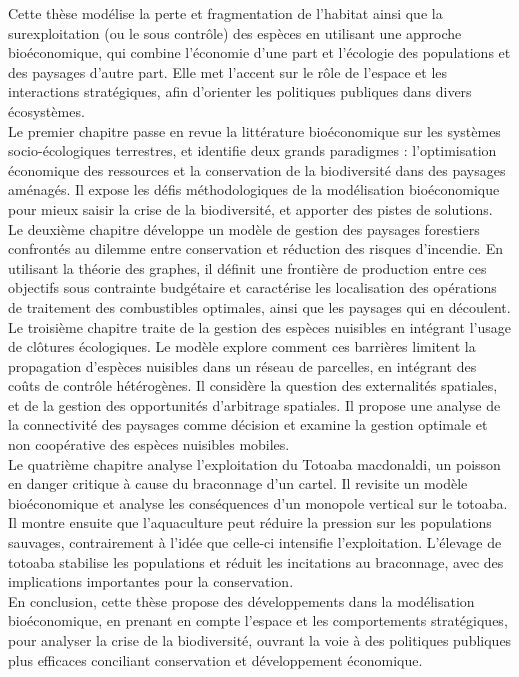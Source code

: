 {Cette thèse modélise la perte et fragmentation de l’habitat ainsi que la surexploitation (ou le sous contrôle) des espèces en utilisant une approche bioéconomique, qui combine l’économie d’une part et l’écologie des populations et des paysages d’autre part. Elle met l’accent sur le rôle de l’espace et les interactions stratégiques, afin d’orienter les politiques publiques dans divers écosystèmes.\\
Le premier chapitre passe en revue la littérature bioéconomique sur les systèmes socio-écologiques terrestres, et identifie deux grands paradigmes : l'optimisation économique des ressources et la conservation de la biodiversité dans des paysages aménagés. Il expose les défis méthodologiques de la modélisation bioéconomique pour mieux saisir la crise de la biodiversité, et apporter des pistes de solutions.\\
Le deuxième chapitre développe un modèle de gestion des paysages forestiers confrontés au dilemme entre conservation
et réduction des risques d’incendie. En utilisant la théorie des graphes, il définit une frontière de production entre ces objectifs sous contrainte budgétaire et caractérise les localisation des opérations de traitement des combustibles optimales, ainsi que les paysages qui en découlent.\\
Le troisième chapitre traite de la gestion des espèces nuisibles en intégrant l’usage de clôtures écologiques. Le modèle explore comment ces barrières limitent la propagation d’espèces nuisibles dans un réseau de parcelles, en intégrant des coûts de contrôle hétérogènes. Il considère la question des externalités spatiales, et de la gestion des opportunités d’arbitrage spatiales. Il propose une analyse de la connectivité des paysages comme décision et examine la gestion optimale et non coopérative des espèces nuisibles mobiles. \\
Le quatrième chapitre analyse l’exploitation du Totoaba macdonaldi, un poisson en danger critique à cause du braconnage d’un cartel. Il revisite un modèle bioéconomique et analyse les conséquences d’un monopole vertical sur le totoaba. Il montre ensuite que l’aquaculture peut réduire la pression sur les populations sauvages, contrairement à l'idée que celle-ci intensifie l'exploitation. L’élevage de totoaba stabilise les populations et réduit les incitations au braconnage, avec des implications importantes pour la conservation.\\
En conclusion, cette thèse propose des développements dans la modélisation bioéconomique, en prenant en compte l’espace et les comportements stratégiques, pour analyser la crise de la biodiversité, ouvrant la voie à des politiques publiques plus efficaces conciliant conservation et développement économique.
}															%

